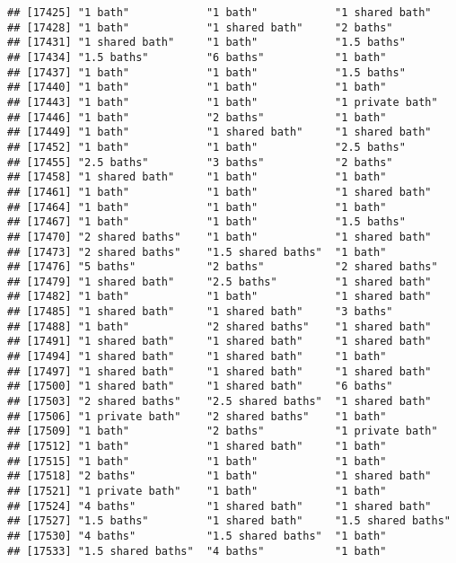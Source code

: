 \documentclass[
]{article}
\begin{document}
\begin{verbatim}
## [17425] "1 bath"            "1 bath"            "1 shared bath"    
## [17428] "1 bath"            "1 shared bath"     "2 baths"          
## [17431] "1 shared bath"     "1 bath"            "1.5 baths"        
## [17434] "1.5 baths"         "6 baths"           "1 bath"           
## [17437] "1 bath"            "1 bath"            "1.5 baths"        
## [17440] "1 bath"            "1 bath"            "1 bath"           
## [17443] "1 bath"            "1 bath"            "1 private bath"   
## [17446] "1 bath"            "2 baths"           "1 bath"           
## [17449] "1 bath"            "1 shared bath"     "1 shared bath"    
## [17452] "1 bath"            "1 bath"            "2.5 baths"        
## [17455] "2.5 baths"         "3 baths"           "2 baths"          
## [17458] "1 shared bath"     "1 bath"            "1 bath"           
## [17461] "1 bath"            "1 bath"            "1 shared bath"    
## [17464] "1 bath"            "1 bath"            "1 bath"           
## [17467] "1 bath"            "1 bath"            "1.5 baths"        
## [17470] "2 shared baths"    "1 bath"            "1 shared bath"    
## [17473] "2 shared baths"    "1.5 shared baths"  "1 bath"           
## [17476] "5 baths"           "2 baths"           "2 shared baths"   
## [17479] "1 shared bath"     "2.5 baths"         "1 shared bath"    
## [17482] "1 bath"            "1 bath"            "1 shared bath"    
## [17485] "1 shared bath"     "1 shared bath"     "3 baths"          
## [17488] "1 bath"            "2 shared baths"    "1 shared bath"    
## [17491] "1 shared bath"     "1 shared bath"     "1 shared bath"    
## [17494] "1 shared bath"     "1 shared bath"     "1 bath"           
## [17497] "1 shared bath"     "1 shared bath"     "1 shared bath"    
## [17500] "1 shared bath"     "1 shared bath"     "6 baths"          
## [17503] "2 shared baths"    "2.5 shared baths"  "1 shared bath"    
## [17506] "1 private bath"    "2 shared baths"    "1 bath"           
## [17509] "1 bath"            "2 baths"           "1 private bath"   
## [17512] "1 bath"            "1 shared bath"     "1 bath"           
## [17515] "1 bath"            "1 bath"            "1 bath"           
## [17518] "2 baths"           "1 bath"            "1 shared bath"    
## [17521] "1 private bath"    "1 bath"            "1 bath"           
## [17524] "4 baths"           "1 shared bath"     "1 shared bath"    
## [17527] "1.5 baths"         "1 shared bath"     "1.5 shared baths" 
## [17530] "4 baths"           "1.5 shared baths"  "1 bath"           
## [17533] "1.5 shared baths"  "4 baths"           "1 bath"           

\end{verbatim}
\end{document}
